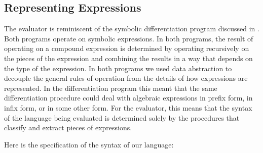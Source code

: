 \subsection{Representing Expressions}
\label{Section 4.1.2}

The evaluator is reminiscent of the symbolic differentiation program discussed
in .  Both programs operate on symbolic expressions.  In
both programs, the result of operating on a compound expression is determined
by operating recursively on the pieces of the expression and combining the
results in a way that depends on the type of the expression.  In both programs
we used data abstraction to decouple the general rules of operation from the
details of how expressions are represented.  In the differentiation program
this meant that the same differentiation procedure could deal with algebraic
expressions in prefix form, in infix form, or in some other form.  For the
evaluator, this means that the syntax of the language being evaluated is
determined solely by the procedures that classify and extract pieces of
expressions.

Here is the specification of the syntax of our language:

